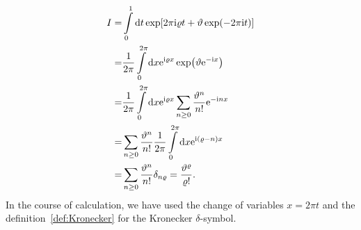 \documentclass[12pt]{article}
\numberwithin{equation}{section}
\begin{document}
	\begin{align}
		I = & \int\limits_{0}^{1} {\rm d} t \exp[2\pi {\rm i} \varrho t + \vartheta\exp(-2\pi {\rm i}t)]
		\nonumber\\	
		= & \frac{1}{2\pi} \int\limits_{0}^{2\pi} {\rm d}x {\rm e}^{{\rm i}\varrho x} \exp(\vartheta {\rm e}^{-{\rm i}x})
		\nonumber\\
		= & \frac{1}{2\pi} \int\limits_{0}^{2\pi} {\rm d}x {\rm e}^{{\rm i}\varrho x} \sum_{n \geq 0} \frac{\vartheta^n}{n!} {\rm e}^{-{\rm i}nx}
		\nonumber\\
		= & \sum_{n \geq 0} \frac{\vartheta^n}{n!} \frac{1}{2\pi} \int\limits_{0}^{2\pi} {\rm d}x {\rm e}^{{\rm i}(\varrho - n)x}
		\nonumber\\
		= & \sum_{n \geq 0} \frac{\vartheta^n}{n!} \delta_{n\varrho} = \frac{\vartheta^{\varrho}}{\varrho!}.
	\end{align}
	In the course of calculation, we have used the change of variables $x = 2\pi t$ and the definition~\eqref{def:Kronecker} for the Kronecker $\delta$-symbol.
	
\end{document}
